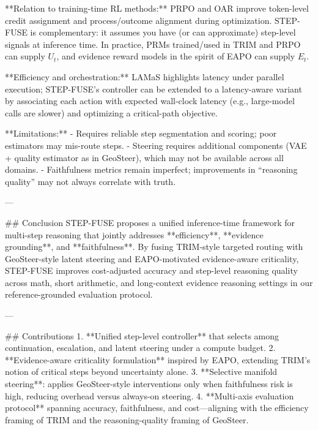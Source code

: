 **Relation to training-time RL methods:** PRPO and OAR improve token-level credit assignment and process/outcome alignment during optimization. STEP-FUSE is complementary: it assumes you have (or can approximate) step-level signals at inference time. In practice, PRMs trained/used in TRIM and PRPO can supply \(U_t\), and evidence reward models in the spirit of EAPO can supply \(E_t\).

**Efficiency and orchestration:** LAMaS highlights latency under parallel execution; STEP-FUSE’s controller can be extended to a latency-aware variant by associating each action with expected wall-clock latency (e.g., large-model calls are slower) and optimizing a critical-path objective.

**Limitations:**  
- Requires reliable step segmentation and scoring; poor estimators may mis-route steps.  
- Steering requires additional components (VAE + quality estimator as in GeoSteer), which may not be available across all domains.  
- Faithfulness metrics remain imperfect; improvements in “reasoning quality” may not always correlate with truth.

---

## Conclusion  
STEP-FUSE proposes a unified inference-time framework for multi-step reasoning that jointly addresses **efficiency**, **evidence grounding**, and **faithfulness**. By fusing TRIM-style targeted routing with GeoSteer-style latent steering and EAPO-motivated evidence-aware criticality, STEP-FUSE improves cost-adjusted accuracy and step-level reasoning quality across math, short arithmetic, and long-context evidence reasoning settings in our reference-grounded evaluation protocol.

---

## Contributions  
1. **Unified step-level controller** that selects among continuation, escalation, and latent steering under a compute budget.  
2. **Evidence-aware criticality formulation** inspired by EAPO, extending TRIM’s notion of critical steps beyond uncertainty alone.  
3. **Selective manifold steering**: applies GeoSteer-style interventions only when faithfulness risk is high, reducing overhead versus always-on steering.  
4. **Multi-axis evaluation protocol** spanning accuracy, faithfulness, and cost—aligning with the efficiency framing of TRIM and the reasoning-quality framing of GeoSteer.